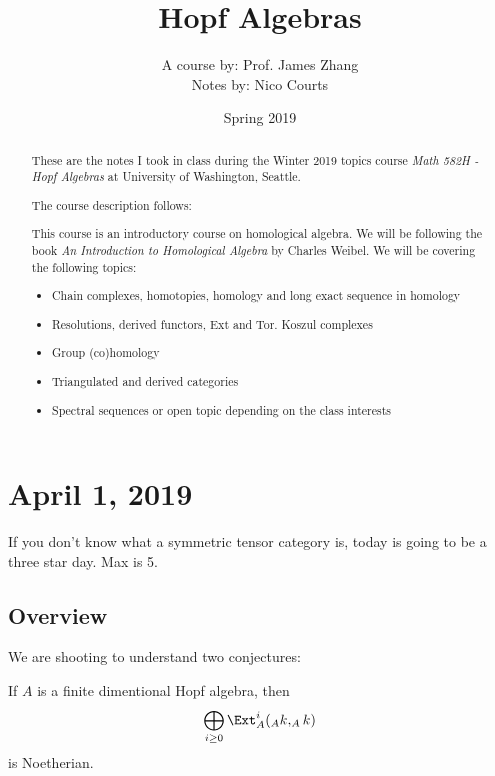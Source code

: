 \documentclass[12pt]{article}
\begin{document}
\title{Hopf Algebras\vspace{-1ex}}
\author{A course by: Prof. James Zhang\\
Notes by: Nico Courts}
\date{Spring 2019}
\maketitle

\renewcommand{\abstractname}{Introduction}
\begin{abstract}
	These are the notes I took in class during the Winter 2019 topics course
	\textit{Math 582H - Hopf Algebras} at University of Washington, Seattle. 
	
	The course description follows:

	\brk

	This course is an introductory course on homological algebra. We will be following the 
	book \textit{An Introduction to Homological Algebra} by Charles Weibel. We will be
	covering the following topics:

\begin{itemize}
	\item Chain complexes, homotopies, homology and long exact sequence in homology
	\item Resolutions, derived functors, Ext and Tor. Koszul complexes
	\item Group (co)homology
	\item Triangulated and derived categories
	\item Spectral sequences or open topic depending on the class interests
\end{itemize}
\end{abstract}

\section{April 1, 2019}
If you don't know what a symmetric tensor category is, today is going to be a three 
star day. Max is 5.

\subsection{Overview}
We are shooting to understand two conjectures:

\begin{conj}
	If $A$ is a finite dimentional Hopf algebra, then 
	\[\bigoplus_{i\ge 0}\Ext_A^i(_Ak, _Ak)\]
	is Noetherian.
\end{conj}
\end{document}
